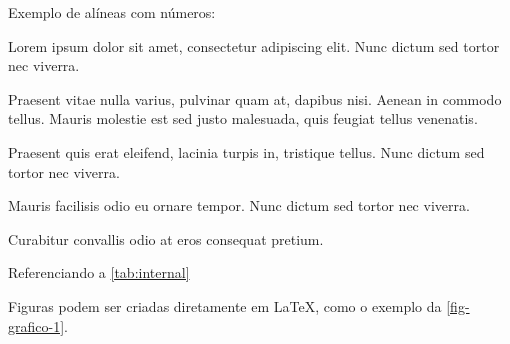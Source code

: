 
Exemplo de alíneas com números:

\begin{alineascomnumero}
	\item Lorem ipsum dolor sit amet, consectetur adipiscing elit. Nunc dictum sed tortor nec viverra.
	\item Praesent vitae nulla varius, pulvinar quam at, dapibus nisi. Aenean in commodo tellus. Mauris molestie est sed justo malesuada, quis feugiat tellus venenatis.
	\item Praesent quis erat eleifend, lacinia turpis in, tristique tellus. Nunc dictum sed tortor nec viverra.
	\item Mauris facilisis odio eu ornare tempor. Nunc dictum sed tortor nec viverra.
	\item Curabitur convallis odio at eros consequat pretium.
\end{alineascomnumero}

\lipsum[12]

\begin{table}[!htbp]	
	\centering
\end{table}

\lipsum[2] Referenciando a \autoref{tab:internal} \lipsum[2]

Figuras podem ser criadas diretamente em LaTeX,
como o exemplo da \ref{fig-grafico-1}.

